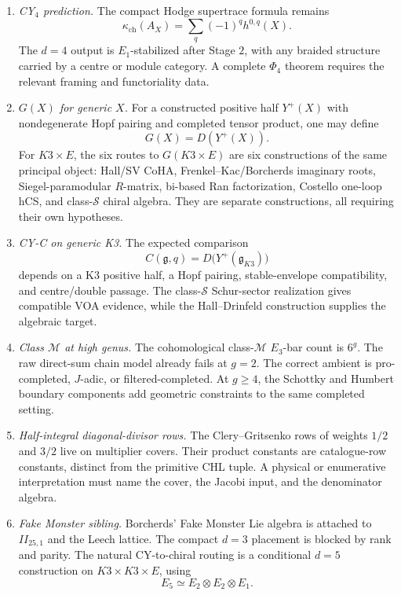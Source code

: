 \documentclass[10pt]{article}
\providecommand{\kch}{\kappa_{\mathrm{ch}}}
\begin{document}
\begin{enumerate}
\item \emph{CY\(_4\) prediction.}
The compact Hodge supertrace formula remains
\[
        \kch(A_X)=\sum_q(-1)^q h^{0,q}(X).
\]
The \(d=4\) output is \(E_1\)-stabilized after Stage \(2\), with any
braided structure carried by a centre or module category.  A complete
\(\Phi_4\) theorem requires the relevant framing and functoriality
data.

\item \emph{\(G(X)\) for generic \(X\).}
For a constructed positive half \(Y^+(X)\) with nondegenerate Hopf
pairing and completed tensor product, one may define
\[
        G(X)=D(Y^+(X)).
\]
For \(K3\times E\), the six routes to \(G(K3\times E)\) are six
constructions of the same principal object: Hall/SV CoHA,
Frenkel--Kac/Borcherds imaginary roots, Siegel-paramodular
\(R\)-matrix, bi-based Ran factorization, Costello one-loop hCS, and
class-\(\mathcal S\) chiral algebra.  They are separate constructions,
all requiring their own hypotheses.

\item \emph{CY-C on generic K3.}
The expected comparison
\[
        C(\mathfrak g,q)=D\bigl(Y^+(\mathfrak g_{K3})\bigr)
\]
depends on a K3 positive half, a Hopf pairing, stable-envelope
compatibility, and centre/double passage.  The class-\(\mathcal S\)
Schur-sector realization gives compatible VOA evidence, while the
Hall--Drinfeld construction supplies the algebraic target.

\item \emph{Class \(\mathcal M\) at high genus.}
The cohomological class-\(\mathcal M\) \(E_3\)-bar count is \(6^g\).
The raw direct-sum chain model already fails at \(g=2\).  The correct
ambient is pro-completed, \(J\)-adic, or filtered-completed.  At
\(g\ge4\), the Schottky and Humbert boundary components add geometric
constraints to the same completed setting.

\item \emph{Half-integral diagonal-divisor rows.}
The Clery--Gritsenko rows of weights \(1/2\) and \(3/2\) live on
multiplier covers.  Their product constants are catalogue-row
constants, distinct from the primitive CHL tuple.  A physical or
enumerative interpretation must name the cover, the Jacobi input, and
the denominator algebra.

\item \emph{Fake Monster sibling.}
Borcherds' Fake Monster Lie algebra is attached to
\(II_{25,1}\) and the Leech lattice.  The compact \(d=3\) placement is
blocked by rank and parity.  The natural CY-to-chiral routing is a
conditional \(d=5\) construction on \(K3\times K3\times E\), using
\[
        E_5\simeq E_2\otimes E_2\otimes E_1.
\]


\end{enumerate}
\end{document}
